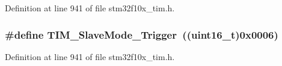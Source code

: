 Definition at line 941 of file stm32f10x\+\_\+tim.\+h.

\subsubsection[{\texorpdfstring{T\+I\+M\+\_\+\+Slave\+Mode\+\_\+\+Trigger}{TIM_SlaveMode_Trigger}}]{\setlength{\rightskip}{0pt plus 5cm}\#define T\+I\+M\+\_\+\+Slave\+Mode\+\_\+\+Trigger~(({\bf uint16\+\_\+t})0x0006)}\hypertarget{group___t_i_m___slave___mode_ga9e7726c04ee1bafec97226f08adf5677}{}\label{group___t_i_m___slave___mode_ga9e7726c04ee1bafec97226f08adf5677}


Definition at line 941 of file stm32f10x\+\_\+tim.\+h.

